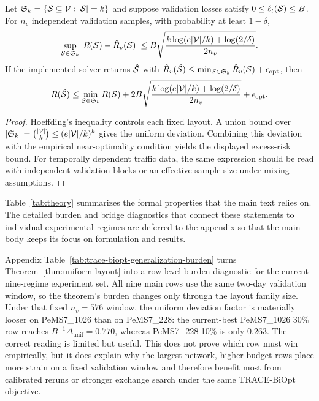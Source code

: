 \begin{theorem}
\label{thm:uniform-layout}
Let $\mathfrak{S}_k=\{\mathcal{S}\subseteq\mathcal{V}:|\mathcal{S}|=k\}$ and suppose validation
losses satisfy $0\le \ell_t(\mathcal{S})\le B$. For $n_v$ independent validation
samples, with probability at least $1-\delta$,
\[
    \sup_{\mathcal{S}\in\mathfrak{S}_k}
    |R(\mathcal{S})-\hat{R}_v(\mathcal{S})|
    \le
    B\sqrt{\frac{k\log(e|\mathcal{V}|/k)+\log(2/\delta)}{2n_v}} .
\]
If the implemented solver returns $\hat{\mathcal{S}}$ with
$\hat{R}_v(\hat{\mathcal{S}})\le \min_{\mathcal{S}\in\mathfrak{S}_k}\hat{R}_v(\mathcal{S})
+\epsilon_{\mathrm{opt}}$, then
\[
    R(\hat{\mathcal{S}})
    \le
    \min_{\mathcal{S}\in\mathfrak{S}_k}R(\mathcal{S})
    +2B\sqrt{\frac{k\log(e|\mathcal{V}|/k)+\log(2/\delta)}{2n_v}}
    +\epsilon_{\mathrm{opt}} .
\]
\end{theorem}

\begin{proof}
Hoeffding's inequality controls each fixed layout. A union bound over
$|\mathfrak{S}_k|=\binom{|\mathcal{V}|}{k}\le(e|\mathcal{V}|/k)^k$ gives the uniform
deviation. Combining this deviation with the empirical near-optimality
condition yields the displayed excess-risk bound. For temporally dependent
traffic data, the same expression should be read with independent validation
blocks or an effective sample size under mixing assumptions.
\end{proof}


\FloatBarrier

Table~\ref{tab:theory} summarizes the formal properties that the main text
relies on. The detailed burden and bridge diagnostics that connect these
statements to individual experimental regimes are deferred to the appendix so
that the main body keeps its focus on formulation and results.

Appendix Table~\ref{tab:trace-biopt-generalization-burden} turns
Theorem~\ref{thm:uniform-layout} into a row-level burden diagnostic for the
current nine-regime experiment set. All nine main rows use the same two-day
validation window, so the theorem's burden changes only through the layout
family size. Under that fixed $n_v=576$ window, the uniform deviation factor is
materially looser on PeMS7\_1026 than on PeMS7\_228: the current-best
PeMS7\_1026 30\% row reaches $B^{-1}\Delta_{\mathrm{unif}}=0.770$, whereas
PeMS7\_228 10\% is only 0.263. The correct reading is limited but useful. This
does not prove which row must win empirically, but it does explain why the
largest-network, higher-budget rows place more strain on a fixed validation
window and therefore benefit most from calibrated reruns or stronger exchange
search under the same TRACE-BiOpt objective.

